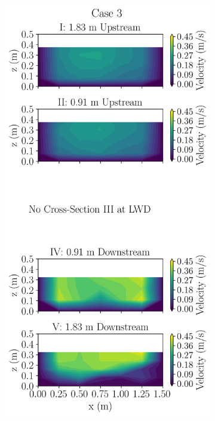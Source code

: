 \documentclass[preview, border=2pt]{standalone}
\begin{document}
\begin{figure}
     \centering
     \begin{subfigure}[b]{0.24\textwidth}
         \centering         
         \caption{}
         \includegraphics[width=\textwidth]{Case3_velocity_contours.png}         

\end{subfigure}
\end{figure}
\end{document}
